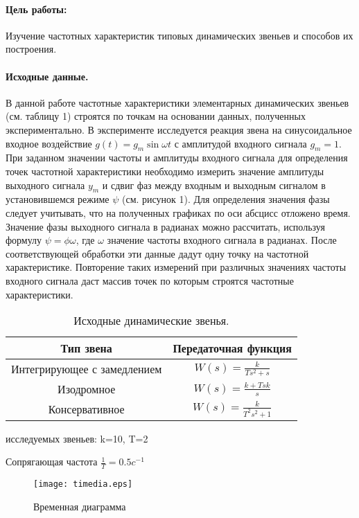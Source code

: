 \documentclass[12pt,a4paper]{article}
\begin{document}


\paragraph{Цель работы:}Изучение частотных характеристик типовых динамических звеньев и способов их построения.%
\paragraph{Исходные данные.}
В данной работе частотные характеристики элементарных динамических звеньев (см. таблицу 1) строятся по точкам на основании данных, полученных экспериментально. В эксперименте исследуется реакция звена на синусоидальное входное воздействие $g(t) = g_m\sin{\omega t}$ с амплитудой входного сигнала $g_m=1$. При заданном значении частоты и амплитуды входного сигнала для определения точек частотной характеристики необходимо измерить значение амплитуды выходного сигнала $y_m$ и сдвиг фаз между входным и выходным сигналом в установившемся режиме $\psi$ (см. рисунок 1). Для определения значения фазы следует учитывать, что на полученных графиках по оси абсцисс отложено время. Значение фазы выходного сигнала в радианах можно рассчитать, используя формулу $\psi=\phi\omega$, где $\omega$ значение частоты входного сигнала в радианах. После соответствующей обработки эти данные дадут одну точку на частотной характеристике. Повторение таких измерений при различных значениях частоты входного сигнала даст массив точек по которым строятся частотные характеристики.
\begin{table}[h!]
	\renewcommand{\arraystretch}{1.8} %
	\centering
	\begin{threeparttable}
	\caption{Исходные динамические звенья.}
	\begin{tabular}{|c|c|}
		\hline Тип звена & Передаточная функция\\
		\hline Интегрирующее с замедлением & $W(s) = \displaystyle{\frac{k}{Ts^2 + s}}$ \\
		\hline Изодромное & $W(s) = \displaystyle{\frac{k + Tsk}{s}}$ \\
		\hline Консервативное & $W(s) = \displaystyle{\frac{k}{T^2s^2 + 1}}$ \\
		\hline
	\end{tabular}
	\end{threeparttable}
\end{table} 
 исследуемых звеньев: k=10, T=2\par
Сопрягающая частота $\frac{1}{T}=0.5c^{-1}$
\begin{figure}[H]
	\centering
	\texttt{[image: timedia.eps]}
	\caption{Временная диаграмма}
\end{figure}
\end{document}

